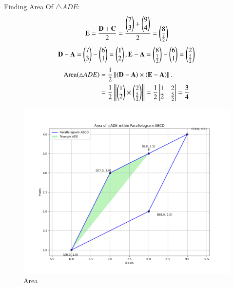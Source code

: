 \documentclass[journal]{IEEEtran}
\begin{document}
Finding Area Of $\triangle{ADE}$:
\begin{align}
\mathbf{E}=\frac{\mathbf{D}+\mathbf{C}}2 =\frac{\begin{pmatrix}7\\3\end{pmatrix}+\begin{pmatrix}9\\4\end{pmatrix}}2=\begin{pmatrix}8\\\frac{7}2\end{pmatrix} 
\end{align}
\begin{align}
\mathbf{D}-\mathbf{A}=\begin{pmatrix}7\\3\end{pmatrix}-\begin{pmatrix}6\\1\end{pmatrix}=\begin{pmatrix}1\\2\end{pmatrix},\mathbf{E}-\mathbf{A}=\begin{pmatrix}8\\\frac72\end{pmatrix}-\begin{pmatrix}6\\1\end{pmatrix}=\begin{pmatrix}2\\\frac52\end{pmatrix} 
\end{align}
\begin{align}
\text{Area\brak{\triangle ADE}}&=\frac12\norm{\brak{\vec{D}-\vec{A}}\times\brak{\vec{E}-\vec{A}}}. \\
& =\frac12\norm{\myvec{1\\2}\times \myvec{2\\\frac52}} = \frac{1}{2}\mdet{1 & 2 \\ 2 & \frac{5}{2}}=\frac{3}{4} 
\end{align}

\begin{figure}[h!]
   \centering
   \includegraphics[width=0.7\columnwidth]{figs/fig1.png}
   \caption{Area}
   \label{stemplot}
\end{figure}
\end{document}
